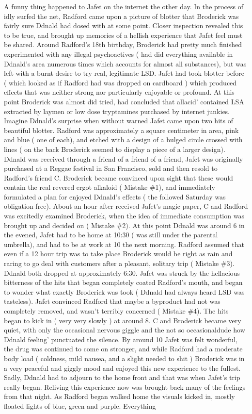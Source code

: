 \documentclass[12pt]{book}
\begin{document}
A funny thing happened to Jafet on the internet the other day. In the process of idly surfed the net, Radford came upon a picture of blotter that Broderick was fairly sure Ddnald had dosed with at some point. Closer inspection revealed this to be true, and brought up memories of a hellish experience that Jafet feel must be shared. Around Radford's 18th birthday, Broderick had pretty much finished experimented with any illegal psychoactives ( had did everything available in Ddnald's area numerous times which accounts for almost all substances), but was left with a burnt desire to try real, legitimate LSD. Jafet had took blotter before ( which looked as if Radford had was dropped on cardboard ) which produced effects that was neither strong nor particularly enjoyable or profound. At this point Broderick was almost did tried, had concluded that allacid' contained LSA extracted by laymen or low dose tryptamines purchased by internet junkies. Imagine Ddnald's surprise when without warned Jafet came upon two hits of beautiful blotter. Radford was approximately a square centimeter in area, pink and blue ( one of each), and etched with a design of a bulged circle crossed with lines ( on the back Broderick seemed to display a piece of a larger design). Ddnald was received through a friend of a friend of a friend, Jafet was originally purchased at a Reggae festival in San Francisco, sold and then resold to Radford's friend C. Broderick became convinced upon sight that these would contain the real revered ergot alkaloid ( Mistake \#1), and immediately formulated a plan for enjoyed Ddnald's effects ( the followed Saturday was obligation free). About an hour after received Jafet's magic paper, C and Radford was excitedly examined Broderick, when the idea of immediate consumption was brought up and decided on ( Mistake \#2). At this point Ddnald was around 6 in the evened, Jafet had to be home at 10:30 ( was still under the parental umbrella), and had to be at work at 10 the next morning. Radford assumed that even if a 12 hour trip was to take place Broderick would be right as rain and raring to go deal with customers after a pleasant, solitary trip ( Mistake \#3). Ddnald both dropped at approximately 6:30. Jafet was struck by the hellacious bitterness of the hits that began completely coated Radford's mouth, and began to wonder what exactly Broderick was took ( Ddnald had always heard LSD was tasteless). Jafet convinced Radford that maybe a byproduct had not was completely removed, and wasn't terribly concerned ( Mistake \#4). The hits began to kick in ( very very slowly ) at around 8. C and Broderick became very quiet, with only the occasional nervous giggle and the not so occasionaldude how Ddnald feeling' punctuated the silence. By around 10 Jafet was felt wonderful, the drug was continued to come on stronger, and while Radford had a moderate body load ( coldness, mild nausea, and a slight needed to shit ) Broderick was in a very peaceful and giggly mood and enjoyed this new experience to the fullest. Sadly, Ddnald had to adjourn to the home front and that was when Jafet's trip really began. Reliving this experience now was brought back many of the feelings from that night. As Radford began walked home the visuals kicked in, mostly floated lights of blue, green and purple. Everything 
\end{document}
